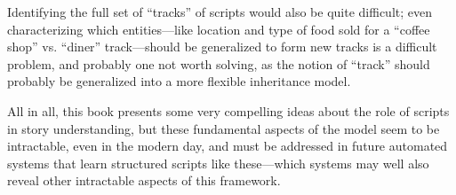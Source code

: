 Identifying the full set of ``tracks'' of scripts would also be quite difficult; even characterizing which entities---like location and type of food sold for a ``coffee shop'' vs. ``diner'' track---should be generalized to form new tracks is a difficult problem, and probably one not worth solving, as the notion of ``track'' should probably be generalized into a more flexible inheritance model.

All in all, this book presents some very compelling ideas about the role of scripts in story understanding, but these fundamental aspects of the model seem to be intractable, even in the modern day, and must be addressed in future automated systems that learn structured scripts like these---which systems may well also reveal other intractable aspects of this framework.





\iffalse
"A script is a structure that describes appropriate sequences of events in a particular context." (p.41)
"A script is made up of slots and requirements about what can fill those slots. The structure is an interconnected whole, and what is in one slot affects what can be in another. Scripts handle stylized everyday situations. They are not subject to much change, nor do they provide the apparatus for handling totally novel situations. Thus, a script is a predetermined, stereotyped sequence of actions that defines a well-known situation. Scripts allow for new references to objects within them just as if thee objects had been previously mentioned; objects within a script may take 'the' without explicit introduction because the script itself has already implicitly introduced them."
\fi